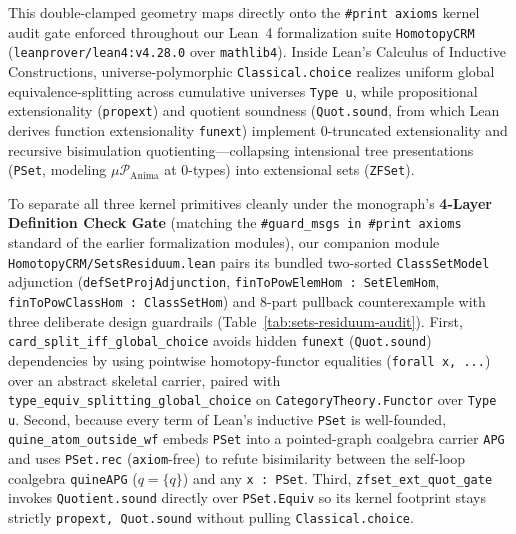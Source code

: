 This double-clamped geometry maps directly onto the \texttt{\#print axioms} kernel audit gate enforced throughout our Lean~4 formalization suite \texttt{HomotopyCRM} (\texttt{leanprover/lean4:v4.28.0} over \texttt{mathlib4}). Inside Lean's Calculus of Inductive Constructions, universe-polymorphic \texttt{Classical.choice} realizes uniform global equivalence-splitting across cumulative universes \texttt{Type u}, while propositional extensionality (\texttt{propext}) and quotient soundness (\texttt{Quot.sound}, from which Lean derives function extensionality \texttt{funext}) implement $0$-truncated extensionality and recursive bisimulation quotienting---collapsing intensional tree presentations (\texttt{PSet}, modeling $\mu \mathcal{P}_{\mathrm{Anima}}$ at $0$-types) into extensional sets (\texttt{ZFSet}).

To separate all three kernel primitives cleanly under the monograph's \textbf{4-Layer Definition Check Gate} (matching the \texttt{\#guard\_msgs in \#print axioms} standard of the earlier formalization modules), our companion module \texttt{HomotopyCRM/\allowbreak SetsResiduum.lean} pairs its bundled two-sorted \texttt{ClassSetModel} adjunction (\texttt{defSetProjAdjunction}, \texttt{finToPowElemHom : SetElemHom}, \texttt{finToPowClassHom : ClassSetHom}) and $8$-part pullback counterexample with three deliberate design guardrails (Table~\ref{tab:sets-residuum-audit}). First, \texttt{card\_\allowbreak split\_\allowbreak iff\_\allowbreak global\_\allowbreak choice} avoids hidden \texttt{funext} (\texttt{Quot.sound}) dependencies by using pointwise homotopy-functor equalities (\texttt{forall x, ...}) over an abstract skeletal carrier, paired with \texttt{type\_\allowbreak equiv\_\allowbreak splitting\_\allowbreak global\_\allowbreak choice} on \texttt{CategoryTheory.Functor} over \texttt{Type u}. Second, because every term of Lean's inductive \texttt{PSet} is well-founded, \texttt{quine\_\allowbreak atom\_\allowbreak outside\_\allowbreak wf} embeds \texttt{PSet} into a pointed-graph coalgebra carrier \texttt{APG} and uses \texttt{PSet.rec} (\texttt{axiom}-free) to refute bisimilarity between the self-loop coalgebra \texttt{quineAPG} ($q = \{q\}$) and any \texttt{x : PSet}. Third, \texttt{zfset\_\allowbreak ext\_\allowbreak quot\_\allowbreak gate} invokes \texttt{Quotient.sound} directly over \texttt{PSet.Equiv} so its kernel footprint stays strictly \texttt{propext, Quot.sound} without pulling \texttt{Classical.choice}.

